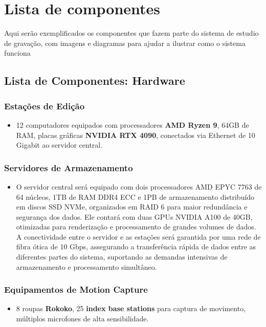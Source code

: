 \section{Lista de componentes} 

Aqui serão exemplificados os componentes que fazem parte do sistema de estudio de gravação, com imagens e diagramas para ajudar a ilustrar como o sistema funciona
\subsection{Lista de Componentes: Hardware}
\subsubsection{Estações de Edição}
\begin{itemize}
    \item 12 computadores equipados com processadores \textbf{AMD Ryzen 9}, 64GB de RAM, placas gráficas \textbf{NVIDIA RTX 4090}, conectados via Ethernet de 10 Gigabit ao servidor central.
\end{itemize}

\subsubsection{Servidores de Armazenamento}
\begin{itemize}
    \item O servidor central será equipado com dois processadores AMD EPYC 7763 de 64 núcleos, 1TB de RAM DDR4 ECC e 1PB de armazenamento distribuído em discos SSD NVMe, organizados em RAID 6 para maior redundância e segurança dos dados. Ele contará com duas GPUs NVIDIA A100 de 40GB, otimizadas para renderização e processamento de grandes volumes de dados. A conectividade entre o servidor e as estações será garantida por uma rede de fibra ótica de 10 Gbps, assegurando a transferência rápida de dados entre as diferentes partes do sistema, suportando as demandas intensivas de armazenamento e processamento simultâneo.
\end{itemize}

\subsubsection{Equipamentos de Motion Capture}
\begin{itemize}
  \item 8 roupas \textbf{Rokoko}, 25 \textbf{index base stations} para captura de movimento, múltiplos microfones de alta sensibilidade.
\end{itemize}


